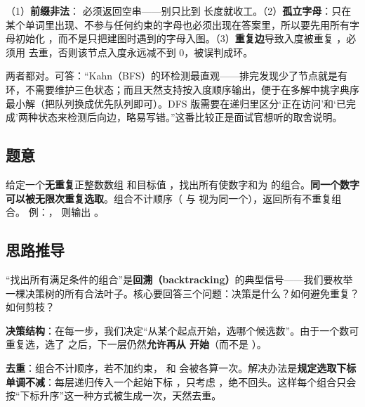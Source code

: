 \begin{pitfall}[两个最常漏的边界]
（1）\textbf{前缀非法}：\code{["abc","ab"]} 必须返回空串——别只比到  长度就收工。（2）\textbf{孤立字母}：只在某个单词里出现、不参与任何约束的字母也必须出现在答案里，所以要先用所有字母初始化 ，而不是只把建图时遇到的字母入图。（3）\textbf{重复边}导致入度被重复 \code{++}，必须用  去重，否则该节点入度永远减不到 0，被误判成环。
\end{pitfall}

\begin{followup}
两者都对。可答：“Kahn（BFS）的环检测最直观——排完发现少了节点就是有环，不需要维护三色状态；而且天然支持按入度顺序输出，便于在多解中挑字典序最小解（把队列换成优先队列即可）。DFS 版需要在递归里区分‘正在访问’和‘已完成’两种状态来检测后向边，略易写错。”这番比较正是面试官想听的取舍说明。
\end{followup}


\subsection*{题意}
给定一个\textbf{无重复}正整数数组  和目标值 ，找出所有使数字和为  的组合。\textbf{同一个数字可以被无限次重复选取}。组合不计顺序（\code{[2,2,3]} 与 \code{[2,3,2]} 视为同一个），返回所有不重复组合。
例：， 则输出 \code{[[2,2,3],[7]]}。

\subsection*{思路推导}
“找出所有满足条件的组合”是\textbf{回溯（backtracking）}的典型信号——我们要枚举一棵决策树的所有合法叶子。核心要回答三个问题：决策是什么？如何避免重复？如何剪枝？

\textbf{决策结构}：在每一步，我们决定“从某个起点开始，选哪个候选数”。由于一个数可重复选，选了  之后，下一层仍然\textbf{允许再从  开始}（而不是 ）。

\textbf{去重}：组合不计顺序，若不加约束，\code{[2,3]} 和 \code{[3,2]} 会被各算一次。解决办法是\textbf{规定选取下标单调不减}：每层递归传入一个起始下标 ，只考虑 ，绝不回头。这样每个组合只会按“下标升序”这一种方式被生成一次，天然去重。


